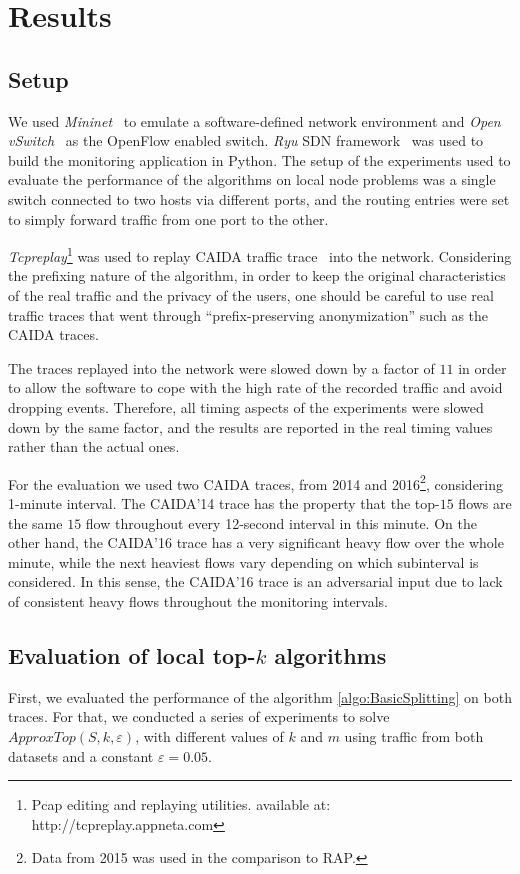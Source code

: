 \section{Results}
\subsection{Setup}
We used \textit{Mininet}~\cite{conf/hotnets/LantzHM10, Mininet} to emulate a software-defined network environment and \textit{Open vSwitch}~\cite{Pfaff2009, OVS} as the OpenFlow enabled switch. \textit{Ryu} SDN framework~\cite{Ryu} was used to build the monitoring application in Python. The setup of the experiments used to evaluate the performance of the algorithms on local node problems was a single switch connected to two hosts via different ports, and the routing entries were set to simply forward traffic from one port to the other.

\textit{Tcpreplay}\footnote{Pcap editing and replaying utilities. available at: http://tcpreplay.appneta.com} was used to replay CAIDA traffic trace~\cite{CAIDA14, CAIDA16} into the network. Considering the prefixing nature of the algorithm, in order to keep the original characteristics of the real traffic and the privacy of the users, one should be careful to use real traffic traces that went through ``prefix-preserving anonymization'' such as the CAIDA traces.

The traces replayed into the network were slowed down by a factor of $11$ in order to allow the software to cope with the high rate of the recorded traffic and avoid dropping events. Therefore, all timing aspects of the experiments were slowed down by the same factor, and the results are reported in the real timing values rather than the actual ones.

For the evaluation we used two CAIDA traces, from 2014 and 2016\footnote{Data from 2015 was used in the comparison to RAP.}, considering 1-minute interval. The CAIDA'14 trace has the property that the top-$15$ flows are the same $15$ flow throughout every 12-second interval in this minute.
On the other hand, the CAIDA'16 trace has a very significant heavy flow over the whole minute, while the next heaviest flows vary depending on which subinterval is considered. In this sense, the CAIDA'16 trace is an adversarial input due to lack of consistent heavy flows throughout the monitoring intervals.

\subsection{Evaluation of local top-$k$ algorithms}
First, we evaluated the performance of the algorithm \ref{algo:BasicSplitting} on both traces. For that, we conducted a series of experiments to solve $ApproxTop(S,k,\varepsilon)$, with different values of $k$ and $m$ using traffic from both datasets and a constant $\varepsilon=0.05$.

